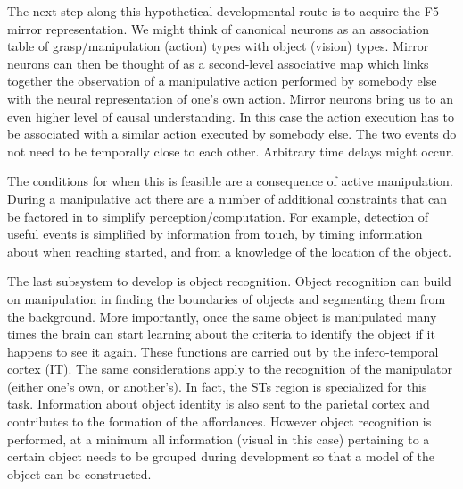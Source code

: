 The next step along this hypothetical developmental route is to 
acquire the F5 mirror representation. We might think of canonical neurons as
an association table of grasp/manipulation (action) types with object
(vision) types.  Mirror neurons can then be thought of as a 
second-level associative map which links together the observation of 
a manipulative action performed by somebody else with the neural 
representation of one's own action.
Mirror neurons bring us to an even higher level of causal 
understanding. In this case the action execution has to be associated
with a similar action executed by somebody else. The two events
do not need to be temporally close to each other. Arbitrary time delays
might occur.

The conditions for when this is feasible are a consequence of active
manipulation. During a manipulative act there are a number of
additional constraints that can be factored in to simplify
perception/computation.  For example, detection of useful events is
simplified by information from touch, by timing information 
about when
reaching started, and from a knowledge of the location of the object.%

The last subsystem to develop is object recognition. Object 
recognition can build on manipulation in finding the boundaries
of objects and segmenting them from the background. More importantly,
once the same object is manipulated many times the brain can
start learning about the criteria to identify the object if 
it happens to see it again. These functions are
carried out by the infero-temporal cortex (IT).
The same considerations apply to the recognition of the 
manipulator (either one's own, or another's). In fact, the STs region is specialized
for this task. Information about object identity is
also sent to the parietal cortex and contributes to 
the formation of the affordances. 
However object recognition is performed, at a minimum all information (visual in this case) pertaining to a certain object
needs to be grouped during development so that a model of the object can be constructed.

